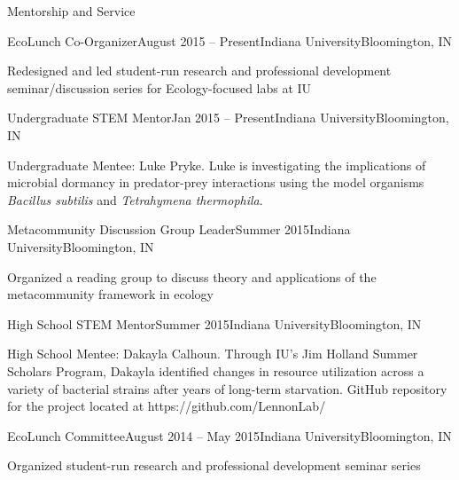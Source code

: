 \documentclass{resume} %
\begin{document}
\newpage
\begin{rSection}{Mentorship and Service}

\begin{rSubsection}{EcoLunch Co-Organizer}{August 2015 -- Present}{Indiana University}{Bloomington, IN}
\item Redesigned and led student-run research and professional development seminar/discussion series for Ecology-focused labs at IU
\end{rSubsection}

\begin{rSubsection}{Undergraduate STEM Mentor}{Jan 2015 -- Present}{Indiana University}{Bloomington, IN}
\item Undergraduate Mentee: Luke Pryke. Luke is investigating the implications of microbial dormancy in predator-prey interactions using the model organisms \emph{Bacillus subtilis} and \emph{Tetrahymena thermophila}.
\end{rSubsection}

\begin{rSubsection}{Metacommunity Discussion Group Leader}{Summer 2015}{Indiana University}{Bloomington, IN}
\item Organized a reading group to discuss theory and applications of the metacommunity framework in ecology
\end{rSubsection}

\begin{rSubsection}{High School STEM Mentor}{Summer 2015}{Indiana University}{Bloomington, IN}
\item High School Mentee: Dakayla Calhoun. Through IU's Jim Holland Summer Scholars Program, Dakayla identified changes in resource utilization across a variety of bacterial strains after years of long-term starvation. GitHub repository for the project located at https://github.com/LennonLab/
\end{rSubsection}

\begin{rSubsection}{EcoLunch Committee}{August 2014 -- May 2015}{Indiana University}{Bloomington, IN}
\item Organized student-run research and professional development seminar series
\end{rSubsection}

\end{rSection}
\end{document}
